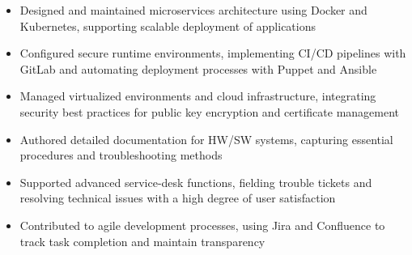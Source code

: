 \par\smallskip
\noindent
\begin{minipage}{20cm}
  \begin{minipage}{9.75cm}
    \begin{itemize}
      \item Designed and maintained microservices architecture using Docker and Kubernetes, supporting scalable deployment of applications
      \item Configured secure runtime environments, implementing CI/CD pipelines with GitLab and automating deployment processes with Puppet and Ansible
      \item Managed virtualized environments and cloud infrastructure, integrating security best practices for public key encryption and certificate management
    \end{itemize}
  \end{minipage}
  \hfill
  \begin{minipage}{9.75cm}
    \begin{itemize}
      \item Authored detailed documentation for HW/SW systems, capturing essential procedures and troubleshooting methods
      \item Supported advanced service-desk functions, fielding trouble tickets and resolving technical issues with a high degree of user satisfaction
      \item Contributed to agile development processes, using Jira and Confluence to track task completion and maintain transparency
    \end{itemize}
  \end{minipage}
\end{minipage}
\par\smallskip
\divider

